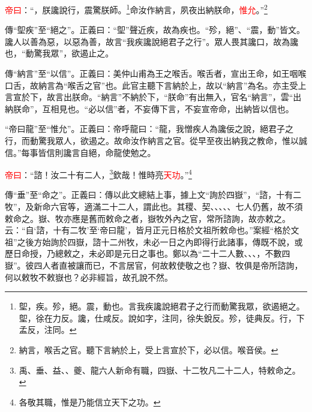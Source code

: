 \textcolor{red}{帝曰}：“，朕讒說行，震驚朕師。\footnote{堲，疾。殄，絕。震，動也。言我疾讒說絕君子之行而動驚我眾，欲遏絕之。堲，徐在力反。讒，仕咸反。說如字，注同，徐失銳反。殄，徒典反。行，下孟反，注同。}命汝作納言，夙夜出納朕命，\textcolor{red}{惟允}。”\footnote{納言，喉舌之官。聽下言納於上，受上言宣於下，必以信。喉音侯。}

{\noindent\zhuan{}\fzbyks 傳“堲疾”至“絕之”。正義曰：“堲”聲近疾，故為疾也。“殄，絕”、“震，動”皆文。讒人以善為惡，以惡為善，故言“我疾讒說絕君子之行”。眾人畏其讒口，故為讒也，“動驚我眾”，欲遏止之。 \par}

{\noindent\zhuan{}\fzbyks 傳“納言”至“以信”。正義曰：美仲山甫為王之喉舌。喉舌者，宣出王命，如王咽喉口舌，故納言為“喉舌之官”也。此官主聽下言納於上，故以“納言”為名。亦主受上言宣於下，故言出朕命。“納言”不納於下，“朕命”有出無入，官名“納言”，雲“出納朕命”，互相見也。“必以信”者，不妄傳下言，不妄宣帝命，出納皆以信也。 \par}

{\noindent\shu{}\fzkt “帝曰龍”至“惟允”。正義曰：帝呼龍曰：“龍，我憎疾人為讒佞之說，絕君子之行，而動驚我眾人，欲遏之。故命汝作納言之官。從早至夜出納我之教命，惟以誠信。”每事皆信則讒言自絕，命龍使勉之。 \par}

\textcolor{red}{帝曰}：“諮！汝二十有二人，\footnote{禹、垂、益、、夔、龍六人新命有職，四嶽、十二牧凡二十二人，特敕命之。}欽哉！惟時亮\textcolor{red}{天功}。”\footnote{各敬其職，惟是乃能信立天下之功。}

{\noindent\zhuan{}\fzbyks 傳“垂”至“命之”。正義曰：傳以此文總結上事，據上文“詢於四嶽”，“諮，十有二牧”，及新命六官等，適滿二十二人，謂此也。其稷、契、、、、、七人仍舊，故不須敕命之。嶽、牧亦應是舊而敕命之者，嶽牧外內之官，常所諮詢，故亦敕之。云：“自‘諮，十有二牧’至‘帝曰龍’，皆月正元日格於文祖所敕命也。”案經“格於文祖”之後方始詢於四嶽，諮十二州牧，未必一日之內即得行此諸事，傳既不說，或歷日命授，乃總敕之，未必即是元日之事也。鄭以為“二十二人數、、、，不數四嶽”。彼四人者直被讓而已，不言居官，何故敕使敬之也？嶽、牧俱是帝所諮詢，何以敕牧不敕嶽也？必非經旨，故孔說不然。 \par}

